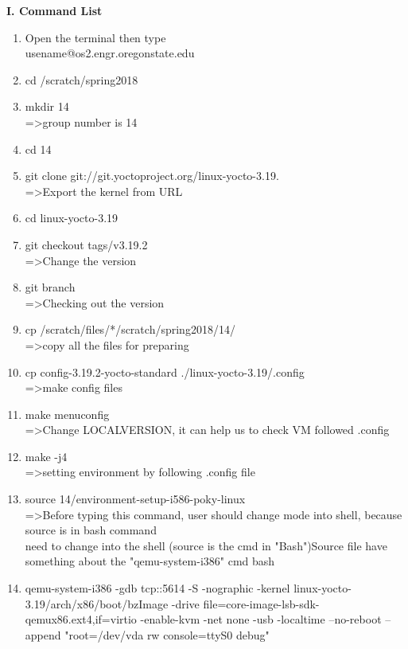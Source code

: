 \documentclass[english,10pt,letterpaper,onecolumn]{IEEEtran}
\begin{document}
 
\begin{center}
{\bf I. Command List}
\begin{enumerate}
  	\item Open the terminal then type \\
  	usename@os2.engr.oregonstate.edu
  	\item cd /scratch/spring2018
  	\item mkdir 14 \\
  	=\textgreater group number is 14
  	\item cd 14
  	\item git clone git://git.yoctoproject.org/linux-yocto-3.19.\\
  	=\textgreater Export the kernel from URL
  	\item cd linux-yocto-3.19
  	\item git checkout tags/v3.19.2\\
  =\textgreater Change the version
  \item git branch  \\
  =\textgreater Checking out the version
  \item cp /scratch/files/*/scratch/spring2018/14/ \\
  =\textgreater copy all the files for preparing
  \item cp config-3.19.2-yocto-standard ./linux-yocto-3.19/.config\\
  =\textgreater make config files
  \item make menuconfig\\
   =\textgreater Change LOCALVERSION, it can help us to check VM followed .config
  \item make -j4\\ 
   =\textgreater setting environment by following .config file
  \item source 14/environment-setup-i586-poky-linux\\
  =\textgreater Before typing this command, user should change mode into shell, because source is in bash command\\need to change into the shell (source is the cmd in "Bash")Source file have something about the "qemu-system-i386" cmd bash
  \item qemu-system-i386 -gdb tcp::5614 -S -nographic -kernel linux-yocto-3.19/arch/x86/boot/bzImage  -drive file=core-image-lsb-sdk-qemux86.ext4,if=virtio -enable-kvm -net none -usb -localtime --no-reboot --append "root=/dev/vda rw console=ttyS0 debug"\\

\end{enumerate}
\end{center}
\end{document}
